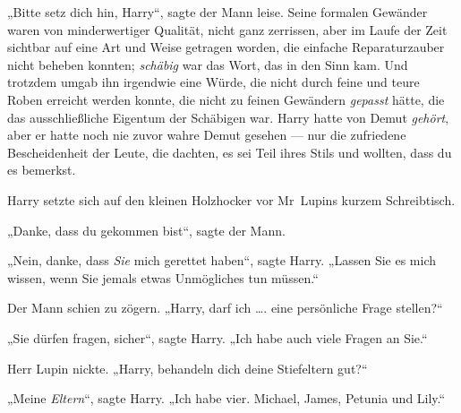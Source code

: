 „Bitte setz dich hin, Harry“, sagte der Mann leise. Seine formalen Gewänder waren von minderwertiger Qualität, nicht ganz zerrissen, aber im Laufe der Zeit sichtbar auf eine Art und Weise getragen worden, die einfache Reparaturzauber nicht beheben konnten; \emph{schäbig} war das Wort, das in den Sinn kam. Und trotzdem umgab ihn irgendwie eine Würde, die nicht durch feine und teure Roben erreicht werden konnte, die nicht zu feinen Gewändern \emph{gepasst} hätte, die das ausschließliche Eigentum der Schäbigen war. Harry hatte von Demut \emph{gehört}, aber er hatte noch nie zuvor wahre Demut gesehen — nur die zufriedene Bescheidenheit der Leute, die dachten, es sei Teil ihres Stils und wollten, dass du es bemerkst.

Harry setzte sich auf den kleinen Holzhocker vor Mr~Lupins kurzem Schreibtisch.

„Danke, dass du gekommen bist“, sagte der Mann.

„Nein, danke, dass \emph{Sie} mich gerettet haben“, sagte Harry.
„Lassen Sie es mich wissen, wenn Sie jemals etwas Unmögliches tun müssen.“

Der Mann schien zu zögern.
„Harry, darf ich …. eine persönliche Frage stellen?“

„Sie dürfen fragen, sicher“, sagte Harry.
„Ich habe auch viele Fragen an Sie.“

Herr Lupin nickte.
„Harry, behandeln dich deine Stiefeltern gut?“

„Meine \emph{Eltern}“, sagte Harry.
„Ich habe vier. Michael, James, Petunia und Lily.“


